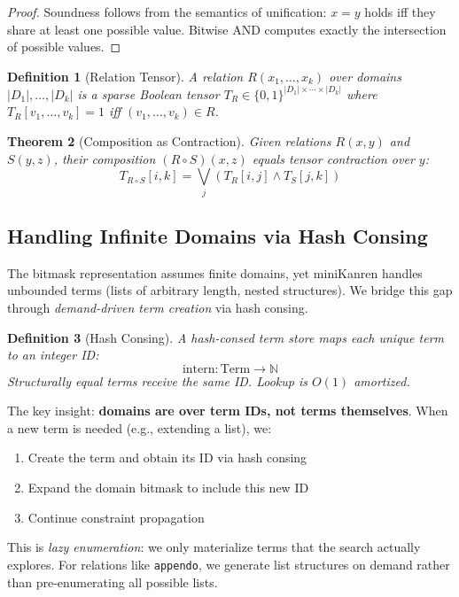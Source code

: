 \documentclass[11pt,a4paper]{article}
\newtheorem{theorem}{Theorem}
\newtheorem{definition}[theorem]{Definition}
\begin{document}
\begin{proof}
Soundness follows from the semantics of unification: $x = y$ holds iff they share at least one possible value.
Bitwise AND computes exactly the intersection of possible values.
\end{proof}

\begin{definition}[Relation Tensor]
A relation $R(x_1, \ldots, x_k)$ over domains $|D_1|, \ldots, |D_k|$ is a sparse Boolean tensor $T_R \in \{0,1\}^{|D_1| \times \cdots \times |D_k|}$ where $T_R[v_1, \ldots, v_k] = 1$ iff $(v_1, \ldots, v_k) \in R$.
\end{definition}

\begin{theorem}[Composition as Contraction]
Given relations $R(x, y)$ and $S(y, z)$, their composition $(R \circ S)(x, z)$ equals tensor contraction over $y$:
\[
T_{R \circ S}[i, k] = \bigvee_j (T_R[i, j] \land T_S[j, k])
\]
\end{theorem}

\subsection{Handling Infinite Domains via Hash Consing}

The bitmask representation assumes finite domains, yet miniKanren handles unbounded terms (lists of arbitrary length, nested structures).
We bridge this gap through \emph{demand-driven term creation} via hash consing.

\begin{definition}[Hash Consing]
A hash-consed term store maps each unique term to an integer ID:
\[
\text{intern}: \text{Term} \to \mathbb{N}
\]
Structurally equal terms receive the same ID. Lookup is $O(1)$ amortized.
\end{definition}

The key insight: \textbf{domains are over term IDs, not terms themselves}.
When a new term is needed (e.g., extending a list), we:
\begin{enumerate}
  \item Create the term and obtain its ID via hash consing
  \item Expand the domain bitmask to include this new ID
  \item Continue constraint propagation
\end{enumerate}

This is \emph{lazy enumeration}: we only materialize terms that the search actually explores.
For relations like \texttt{appendo}, we generate list structures on demand rather than pre-enumerating all possible lists.
\end{document}
